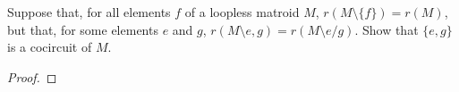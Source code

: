 \prob
{
	Suppose that, for all elements $f$ of a loopless matroid $M$, $r(M\setminus \{f\}) = r(M)$, but that,
	for some elements $e$ and $g$, $r(M \setminus e, g) = r(M \setminus e / g)$. Show that $\{e, g\}$
	is a cocircuit of $M$.
}
\begin{proof}
\end{proof}